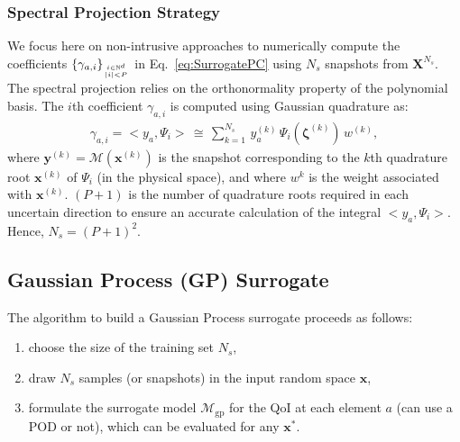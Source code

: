 \subsubsection{Spectral Projection Strategy}

We focus here on non-intrusive approaches to numerically compute the coefficients $\lbrace\gamma_{a,i}\rbrace_{i\in\mathbb{N}^d\atop |i|<P}$  in Eq.~\eqref{eq:SurrogatePC} using $N_{s}$ snapshots from $\mathbf{X}^{N_s}$. The spectral projection relies on the orthonormality property of the polynomial basis. The $i$th coefficient $\gamma_{a,i}$ is computed using Gaussian quadrature as:
\begin{align}
\gamma_{a,i} = <y_a,\Psi_i> \,\cong\,\displaystyle\sum_{k = 1}^{N_{s}}\,y_a^{(k)}\,\Psi_i(\boldsymbol{\zeta}^{(k)})\,w^{(k)},
\label{eq:pc_quadrature}
\end{align}
where $\mathbf{y}^{(k)} = \mathcal{M}(\mathbf{x}^{(k)})$ is the snapshot corresponding to the $k$th quadrature root $\mathbf{x}^{(k)}$ of $\Psi_i$ (in the physical space), and where $w^{k}$ is the weight associated with $\mathbf{x}^{(k)}$. $(P+1)$ is the number of quadrature roots required in each uncertain direction to ensure an accurate calculation of the integral $<y_a,\Psi_i>$. Hence, $N_{s} = (P+1)^2$.


\subsection{Gaussian Process (GP) Surrogate}\label{sec:GP}

The algorithm to build a Gaussian Process surrogate proceeds as follows:
\begin{enumerate}
\item choose the size of the training set $N_{s}$,
\item draw $N_{s}$ samples (or snapshots) in the input random space $\mathbf{x}$,
\item formulate the surrogate model $\mathcal{M}_{\text{gp}}$ for the QoI at each element $a$ (can use a POD or not), which can be evaluated for any $\mathbf{x}^*$.
\end{enumerate}

